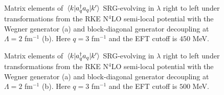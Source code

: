 \documentclass[preprintnumbers,floatfix,aps,prc,preprint,nofootinbib]{revtex4-1}
\begin{document}

\begin{figure}[H]
	\centering
	
	\caption{Matrix elements of $\mel{k}{a^{\dagger}_q a_q}{k'}$ SRG-evolving in $\lambda$ right to left under transformations from the RKE N$^4$LO semi-local potential with the Wegner generator (a) and block-diagonal generator decoupling at $\Lambda=2$ fm$^{-1}$ (b). Here $q=3$ fm$^{-1}$ and the EFT cutoff is $450$ MeV.}
	\label{momentum_projection_contours_q3,00_kvnn111}
\end{figure}

\begin{figure}[H]
	\centering
	
	\caption{Matrix elements of $\mel{k}{a^{\dagger}_q a_q}{k'}$ SRG-evolving in $\lambda$ right to left under transformations from the RKE N$^4$LO semi-local potential with the Wegner generator (a) and block-diagonal generator decoupling at $\Lambda=2$ fm$^{-1}$ (b). Here $q=3$ fm$^{-1}$ and the EFT cutoff is $500$ MeV.}
	\label{momentum_projection_contours_q3,00_kvnn112}
\end{figure}
\end{document}
